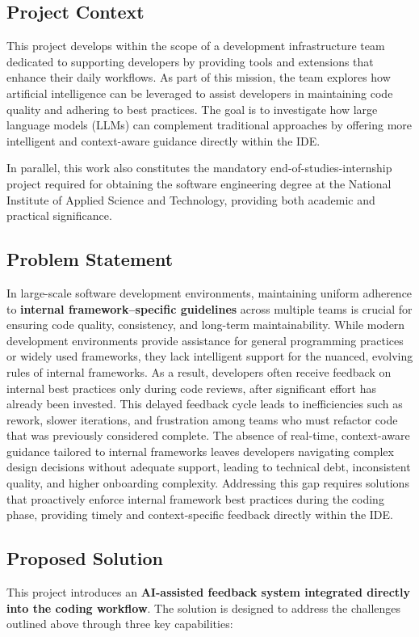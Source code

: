 \begin{spacing}{1.2}
\subsection{Project Context}
This project develops within the scope of a development infrastructure team dedicated to supporting developers by providing tools and extensions that enhance their daily workflows. As part of this mission, the team explores how artificial intelligence can be leveraged to assist developers in maintaining code quality and adhering to best practices. The goal is to investigate how large language models (LLMs) can complement traditional approaches by offering more intelligent and context-aware guidance directly within the IDE.  

In parallel, this work also constitutes the mandatory end-of-studies-internship project required for obtaining the software engineering degree at the National Institute of Applied Science and Technology, providing both academic and practical significance.  

\subsection{Problem Statement}
In large-scale software development environments, maintaining uniform adherence to \textbf{internal framework–specific guidelines} across multiple teams is crucial for ensuring code quality, consistency, and long-term maintainability. While modern development environments provide assistance for general programming practices or widely used frameworks, they lack intelligent support for the nuanced, evolving rules of internal frameworks. As a result, developers often receive feedback on internal best practices only during code reviews, after significant effort has already been invested. This delayed feedback cycle leads to inefficiencies such as rework, slower iterations, and frustration among teams who must refactor code that was previously considered complete. The absence of real-time, context-aware guidance tailored to internal frameworks leaves developers navigating complex design decisions without adequate support, leading to technical debt, inconsistent quality, and higher onboarding complexity. Addressing this gap requires solutions that proactively enforce internal framework best practices during the coding phase, providing timely and context-specific feedback directly within the IDE.  

\subsection{Proposed Solution}
This project introduces an \textbf{AI-assisted feedback system integrated directly into the coding workflow}. The solution is designed to address the challenges outlined above through three key capabilities:  


\end{spacing}
